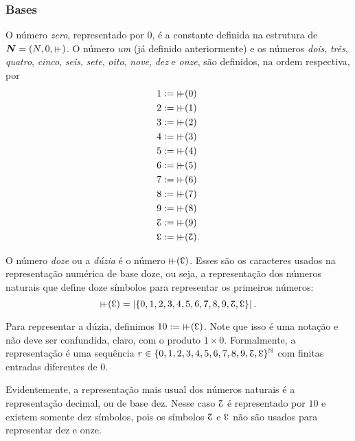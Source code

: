 \cleardoublepage
\subsubsection{Bases}

O número \emph{zero}, representado por $0$, é a constante definida na estrutura de $\bm N = (N,0,\suce)$. O número \emph{um} (já definido anteriormente) e os números \emph{dois}, \emph{três}, \emph{quatro}, \emph{cinco}, \emph{seis}, \emph{sete}, \emph{oito}, \emph{nove}, \emph{dez} e \emph{onze}, são definidos, na ordem respectiva, por
	\begin{align*}
	1 &:= \suce(0) \\
	2 &:= \suce(1) \\
	3 &:= \suce(2) \\
	4 &:= \suce(3) \\
	5 &:= \suce(4) \\
	6 &:= \suce(5) \\
	7 &:= \suce(6) \\
	8 &:= \suce(7) \\
	9 &:= \suce(8) \\
	\dez &:= \suce(9) \\
	\onze &:= \suce(\dez).
	\end{align*}


O número \emph{doze} ou a \emph{dúzia} é o número $\suce(\onze)$. Esses são os caracteres usados na representação numérica de base doze, ou seja, a representação dos números naturais que define doze símbolos para representar os primeiros números:
	\begin{equation*}
	\suce(\onze) = \card{\{0,1,2,3,4,5,6,7,8,9,\dez,\onze\}}.
	\end{equation*}

Para representar a dúzia, definimos $10 := \suce(\onze)$. Note que isso é uma notação e não deve ser confundida, claro, com o produto $1 \times 0$. Formalmente, a representação é uma sequência $r \in \{0,1,2,3,4,5,6,7,8,9,\dez,\onze\}^\N$ com finitas entradas diferentes de $0$.

Evidentemente, a representação mais usual dos números naturais é a representação decimal, ou de base dez. Nesse caso $\dez$ é representado por $10$ e existem somente dez símbolos, pois os símbolos $\dez$ e $\onze$ não são usados para representar dez e onze.

